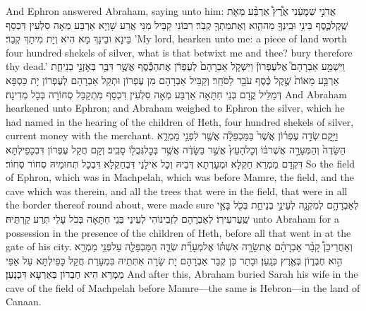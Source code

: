{And Ephron answered Abraham, saying unto him:}{}
{אֲדֹנִ֣י שְׁמָעֵ֔נִי אֶ֩רֶץ֩ אַרְבַּ֨ע מֵאֹ֧ת שֶֽׁקֶל\maqqaf כֶּ֛סֶף בֵּינִ֥י וּבֵֽינְךָ֖ מַה\maqqaf הִ֑וא וְאֶת\maqqaf מֵתְךָ֖ קְבֹֽר׃}
{רִבּוֹנִי קַבֵּיל מִנִּי אֲרַע שָׁוְיָא אַרְבַּע מְאָה סִלְעִין דִּכְסַף בֵּינָא וּבֵינָךְ מָא הִיא וְיָת מִיתָךְ קְבַר׃}
{’My lord, hearken unto me: a piece of land worth four hundred shekels of silver, what is that betwixt me and thee? bury therefore thy dead.’}{}
{וַיִּשְׁמַ֣ע אַבְרָהָם֮ אֶל\maqqaf עֶפְרוֹן֒ וַיִּשְׁקֹ֤ל אַבְרָהָם֙ לְעֶפְרֹ֔ן אֶת\maqqaf הַכֶּ֕סֶף אֲשֶׁ֥ר דִּבֶּ֖ר בְּאׇזְנֵ֣י בְנֵי\maqqaf חֵ֑ת אַרְבַּ֤ע מֵאוֹת֙ שֶׁ֣קֶל כֶּ֔סֶף עֹבֵ֖ר לַסֹּחֵֽר׃}
{וְקַבֵּיל אַבְרָהָם מִן עֶפְרוֹן וּתְקַל אַבְרָהָם לְעֶפְרוֹן יָת כַּסְפָּא דְּמַלֵּיל קֳדָם בְּנֵי חִתָּאָה אַרְבַּע מְאָה סִלְעִין דִּכְסַף מִתְקַבַּל סְחוֹרָה בְּכָל מְדִינָה׃}
{And Abraham hearkened unto Ephron; and Abraham weighed to Ephron the silver, which he had named in the hearing of the children of Heth, four hundred shekels of silver, current money with the merchant.}{}
{וַיָּ֣קׇם \legarmeh  שְׂדֵ֣ה עֶפְר֗וֹן אֲשֶׁר֙ בַּמַּכְפֵּלָ֔ה אֲשֶׁ֖ר לִפְנֵ֣י מַמְרֵ֑א הַשָּׂדֶה֙ וְהַמְּעָרָ֣ה אֲשֶׁר\maqqaf בּ֔וֹ וְכׇל\maqqaf הָעֵץ֙ אֲשֶׁ֣ר בַּשָּׂדֶ֔ה אֲשֶׁ֥ר בְּכׇל\maqqaf גְּבֻל֖וֹ סָבִֽיב׃}
{וְקָם חֲקַל עֶפְרוֹן דִּבְכָפֵילְתָּא דִּקְדָם מַמְרֵא חַקְלָא וּמְעָרְתָא דְּבֵיהּ וְכָל אִילָנֵי דִּבְחַקְלָא דִּבְכָל תְּחוּמֵיהּ סְחוֹר סְחוֹר׃}
{So the field of Ephron, which was in Machpelah, which was before Mamre, the field, and the cave which was therein, and all the trees that were in the field, that were in all the border thereof round about, were made sure}{}
{לְאַבְרָהָ֥ם לְמִקְנָ֖ה לְעֵינֵ֣י בְנֵי\maqqaf חֵ֑ת בְּכֹ֖ל בָּאֵ֥י שַֽׁעַר\maqqaf עִירֽוֹ׃}
{לְאַבְרָהָם לִזְבִינוֹהִי לְעֵינֵי בְּנֵי חִתָּאָה בְּכֹל עָלֵי תְּרַע קַרְתֵּיהּ׃}
{unto Abraham for a possession in the presence of the children of Heth, before all that went in at the gate of his city.}{}
{וְאַחֲרֵי\maqqaf כֵן֩ קָבַ֨ר אַבְרָהָ֜ם אֶת\maqqaf שָׂרָ֣ה אִשְׁתּ֗וֹ אֶל\maqqaf מְעָרַ֞ת שְׂדֵ֧ה הַמַּכְפֵּלָ֛ה עַל\maqqaf פְּנֵ֥י מַמְרֵ֖א הִ֣וא חֶבְר֑וֹן בְּאֶ֖רֶץ כְּנָֽעַן׃}
{וּבָתַר כֵּן קְבַר אַבְרָהָם יָת שָׂרָה אִתְּתֵיהּ בִּמְעָרַת חֲקַל כָּפֵילְתָּא עַל אַפֵּי מַמְרֵא הִיא חֶבְרוֹן בְּאַרְעָא דִּכְנָעַן׃}
{And after this, Abraham buried Sarah his wife in the cave of the field of Machpelah before Mamre—the same is Hebron—in the land of Canaan.}{}

